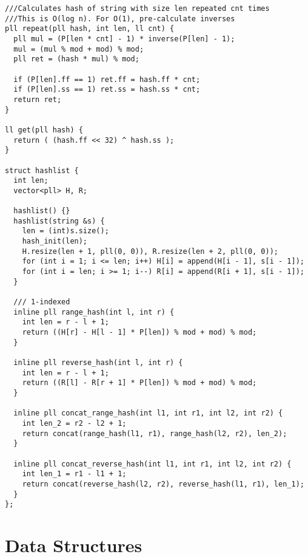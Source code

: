 \documentclass[10pt,a4paper,onesided]{article}
\begin{document}
\begin{multicols*}{3}
\begin{lstlisting}
///Calculates hash of string with size len repeated cnt times
///This is O(log n). For O(1), pre-calculate inverses
pll repeat(pll hash, int len, ll cnt) {
  pll mul = (P[len * cnt] - 1) * inverse(P[len] - 1);
  mul = (mul % mod + mod) % mod;
  pll ret = (hash * mul) % mod;

  if (P[len].ff == 1) ret.ff = hash.ff * cnt;
  if (P[len].ss == 1) ret.ss = hash.ss * cnt;
  return ret;
}

ll get(pll hash) {
  return ( (hash.ff << 32) ^ hash.ss );
}

struct hashlist {
  int len;
  vector<pll> H, R;

  hashlist() {}
  hashlist(string &s) {
    len = (int)s.size();
    hash_init(len);
    H.resize(len + 1, pll(0, 0)), R.resize(len + 2, pll(0, 0));
    for (int i = 1; i <= len; i++) H[i] = append(H[i - 1], s[i - 1]);
    for (int i = len; i >= 1; i--) R[i] = append(R[i + 1], s[i - 1]);
  }
  
  /// 1-indexed
  inline pll range_hash(int l, int r) {
    int len = r - l + 1;
    return ((H[r] - H[l - 1] * P[len]) % mod + mod) % mod;
  }

  inline pll reverse_hash(int l, int r) {
    int len = r - l + 1;
    return ((R[l] - R[r + 1] * P[len]) % mod + mod) % mod;
  }

  inline pll concat_range_hash(int l1, int r1, int l2, int r2) {
    int len_2 = r2 - l2 + 1;
    return concat(range_hash(l1, r1), range_hash(l2, r2), len_2);
  }

  inline pll concat_reverse_hash(int l1, int r1, int l2, int r2) {
    int len_1 = r1 - l1 + 1;
    return concat(reverse_hash(l2, r2), reverse_hash(l1, r1), len_1);
  }
};
\end{lstlisting}
\section{Data Structures}

\end{multicols*}
\end{document}
